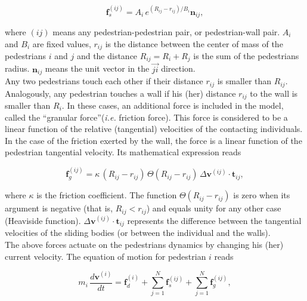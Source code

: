 \documentclass[preprint,12pt]{elsarticle}
\begin{document}
\begin{equation}
        \mathbf{f}_s^{(ij)} = A_i\,e^{(R_{ij}-r_{ij})/B_i}\mathbf{n}_{ij}, 
        \label{social}
\end{equation}

where $(ij)$ means any pedestrian-pedestrian pair, or pedestrian-wall 
pair. $A_i$ and $B_i$ are fixed values, $r_{ij}$ is the distance between  the 
center of mass of the pedestrians $i$ and $j$ and the distance $R_{ij}=R_i+R_j$ 
is the sum of the pedestrians radius. $\mathbf{n}_{ij}$ means the unit vector in 
the $\vec{ji}$ direction.\\

Any two pedestrians touch each other if their distance $r_{ij}$ is smaller than 
$R_{ij}$. Analogously, any pedestrian touches a wall if his (her) distance $r_{ij}$ to the wall is smaller than $R_i$. In these cases, an additional force is included in the model, called the ``granular force''(\textit{i.e.} friction force). This force is considered to be a linear function of the relative (tangential) velocities of the contacting individuals. In the case of the friction exerted by the wall, the force is a linear function of the pedestrian tangential velocity. 
Its mathematical expression reads

\begin{equation}
        \mathbf{f}_g^{(ij)} = 
\kappa\,(R_{ij}-r_{ij})\,\Theta(R_{ij}-r_{ij})\,\Delta
\mathbf{v}^{(ij)}\cdot\mathbf{t}_{ij}, 
        \label{granular}
\end{equation}

where $\kappa$ is the friction coefficient. The function 
$\Theta(R_{ij}-r_{ij})$ is zero when its argument is negative (that is, 
$R_{ij}<r_{ij}$) and equals unity for any other case (Heaviside function). 
$\Delta\mathbf{v}^{(ij)}\cdot\mathbf{t}_{ij}$ represents the difference between 
the tangential velocities of the sliding bodies (or between the individual and 
the walls).\\

The above forces actuate on the pedestrians dynamics by changing his (her) 
current velocity. The equation of motion for pedestrian $i$ reads

\begin{equation}
m_i\,\displaystyle\frac{d\mathbf{v}^{(i)}}{dt}=\mathbf{f}_d^{(i)}
+\displaystyle\sum_{j=1}^{N}\displaystyle\mathbf{f}_s^{(ij)}
+\displaystyle\sum_ {
j=1}^{N}\mathbf{f}_g^{(ij)},\label{eq_mov}
\end{equation}
\end{document}
